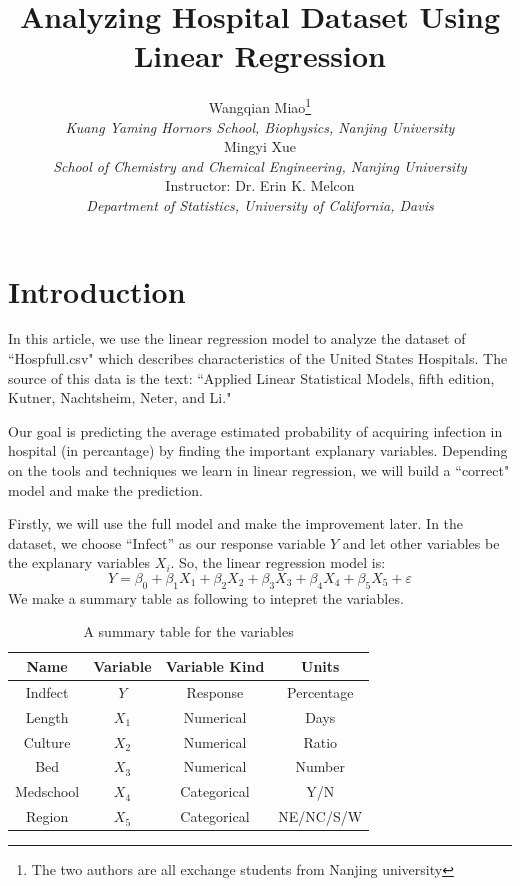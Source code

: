 \documentclass[a4paper,11pt,onecolumn,twoside]{article}
\title{\huge Analyzing Hospital Dataset Using Linear Regression }
\author{
Wangqian Miao\footnote{The two authors are all exchange students from Nanjing university}
\\[2pt]
{\large \textit{Kuang Yaming Hornors School, Biophysics, Nanjing University}}\\[6pt]
Mingyi Xue\\[2pt]
{\large \textit{School of Chemistry and Chemical Engineering, Nanjing University}}\\[6pt]
Instructor: Dr. Erin K. Melcon\\[2pt]
{\large \textit{Department of Statistics, University of California, Davis}}\\[2pt]
}
\date{}
\begin{document}
\maketitle
\thispagestyle{firststyle}
\setlength{\oddsidemargin}{ 1cm}
\setlength{\evensidemargin}{\oddsidemargin}
\setlength{\textwidth}{15.50cm}
\vspace{-.8cm}
\setcounter{page}{1}
\setlength{\oddsidemargin}{-.5cm}  %
\setlength{\evensidemargin}{\oddsidemargin}
\setlength{\textwidth}{17.00cm}
\tableofcontents
\newpage
\section{Introduction}
In this article, we use the linear regression model to analyze the dataset of ``Hospfull.csv" which describes characteristics of the United States Hospitals.
The source of this data is the text: ``Applied Linear Statistical Models, fifth edition, Kutner, Nachtsheim, Neter,
and Li."\par
Our goal is predicting the average estimated probability of acquiring infection in hospital (in percantage) by finding the important explanary variables. Depending on the tools and techniques we learn in linear regression, we will build a ``correct" model and make the prediction. \par
Firstly, we will use the full model and make the improvement later. In the dataset,
we choose ``Infect'' as our response variable $Y$ and let other variables be the explanary variables $X_i$. So, the linear regression model is:
\begin{equation}
Y=\beta_0+\beta_1X_1+\beta_2X_2+\beta_3X_3+\beta_4X_4+\beta_5X_5+\varepsilon
\end{equation}
We make a summary table as following to intepret the variables. 
 \begin{table}[htbp]
 	\centering
 	\begin{tabular}{cccc}
 		\midrule[1.5pt]
 		Name& Variable &Variable Kind  & Units\\
 		\hline
 		Indfect&$Y$ & Response  & Percentage\\
 	    Length& $X_1$& Numerical  & Days  \\
 		 Culture& $X_2$ &Numerical & Ratio \\
 		 Bed& $X_3$ & Numerical& Number \\
 		 Medschool&$X_4$& Categorical  & Y/N \\
 		Region& $X_5$& Categorical  & NE/NC/S/W \\
 		\midrule[1.5pt]
 	\end{tabular}
 	\caption{A summary table for the variables }
 \end{table}
\end{document}
